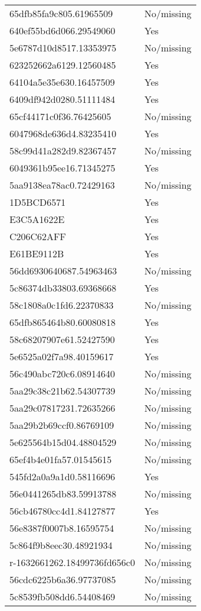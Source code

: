 \begin{tabular}{ll}
65dfb85fa9c805.61965509 & No/missing \\
640ef55bd6d066.29549060 & Yes \\
5e6787d10d8517.13353975 & No/missing \\
623252662a6129.12560485 & Yes \\
64104a5e35e630.16457509 & Yes \\
6409df942d0280.51111484 & Yes \\
65cf44171c0f36.76425605 & No/missing \\
6047968de636d4.83235410 & Yes \\
58c99d41a282d9.82367457 & No/missing \\
6049361b95ee16.71345275 & Yes \\
5aa9138ea78ac0.72429163 & No/missing \\
1D5BCD6571 & Yes \\
E3C5A1622E & Yes \\
C206C62AFF & Yes \\
E61BE9112B & Yes \\
56dd6930640687.54963463 & No/missing \\
5c86374db33803.69368668 & Yes \\
58c1808a0c1fd6.22370833 & No/missing \\
65dfb865464b80.60080818 & Yes \\
58c68207907e61.52427590 & Yes \\
5e6525a02f7a98.40159617 & Yes \\
56c490abc720c6.08914640 & No/missing \\
5aa29c38c21b62.54307739 & No/missing \\
5aa29c07817231.72635266 & No/missing \\
5aa29b2b69ccf0.86769109 & No/missing \\
5e625564b15d04.48804529 & No/missing \\
65ef4b4e01fa57.01545615 & No/missing \\
545fd2a0a9a1d0.58116696 & Yes \\
56e0441265db83.59913788 & No/missing \\
56cb46780cc4d1.84127877 & Yes \\
56e8387f0007b8.16595754 & No/missing \\
5c864f9b8eec30.48921934 & No/missing \\
r-1632661262.18499736fd656c0 & No/missing \\
56cdc6225b6a36.97737085 & No/missing \\
5c8539fb508dd6.54408469 & No/missing \\

\end{tabular}
